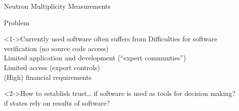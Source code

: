 \documentclass[presentation]{beamer}
\begin{document}
\begin{frame}[label=sec-3-3]{Neutron Multiplicity Measurements}

\end{frame}


\begin{frame}[label=sec-3-4]{Problem}

\begin{alertblock}<1->{Currently used software often suffers from}
Difficulties for software verification (no source code access)\\[0.35em]
Limited application and development (“expert communties”)\\[0.35em]
Limited access (export controls)\\[0.35em]
(High) financial requirements\\[0.35em]
\end{alertblock}

\begin{block}<2->{How to establish trust\ldots{}}
if software is used as tools for decision making?\\[0.5em]
if states rely on results of software?
\end{block}
\end{frame}
\end{document}
